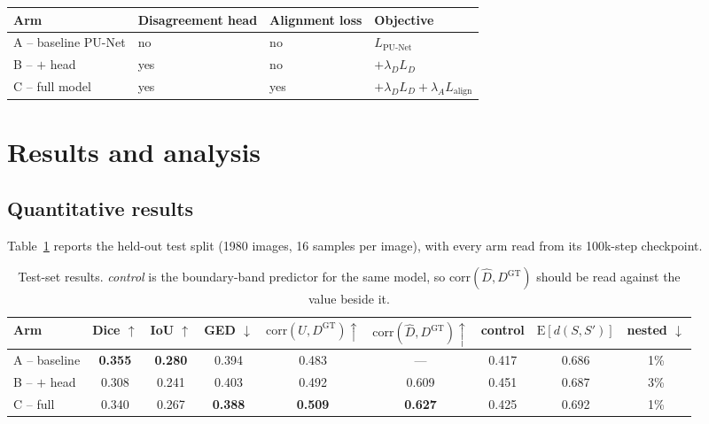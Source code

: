 \documentclass[10pt]{article}
\newcommand{\Dgt}{D^{\mathrm{GT}}}
\begin{document}
\begin{center}\small
\begin{tabular}{llll}
\toprule
Arm & Disagreement head & Alignment loss & Objective \\
\midrule
A -- baseline PU-Net & no  & no  & $L_{\text{PU-Net}}$ \\
B -- $+$ head        & yes & no  & $+\lambda_D L_D$ \\
C -- full model      & yes & yes & $+\lambda_D L_D+\lambda_A L_{\text{align}}$ \\
\bottomrule
\end{tabular}
\end{center}

\section{Results and analysis}\label{sec:results}

\subsection{Quantitative results}

Table~\ref{tab:main} reports the held-out test split (1980 images, 16 samples per
image), with every arm read from its 100k-step checkpoint.

\begin{table}[h]
\centering\footnotesize\setlength{\tabcolsep}{4.5pt}
\begin{tabular}{lcccccccc}
\toprule
Arm & Dice $\uparrow$ & IoU $\uparrow$ & GED $\downarrow$ &
  $\mathrm{corr}(U,\Dgt)\uparrow$ & $\mathrm{corr}(\hat D,\Dgt)\uparrow$ &
  control & $\mathrm{E}[d(S,S')]$ & nested $\downarrow$ \\
\midrule
A -- baseline        & \textbf{0.355} & \textbf{0.280} & 0.394 & 0.483 & --- & 0.417 & 0.686 & 1\% \\
B -- $+$ head        & 0.308 & 0.241 & 0.403 & 0.492 & 0.609 & 0.451 & 0.687 & 3\% \\
C -- full            & 0.340 & 0.267 & \textbf{0.388} & \textbf{0.509} & \textbf{0.627} & 0.425 & 0.692 & 1\% \\
\bottomrule
\end{tabular}
\caption{Test-set results. \emph{control} is the boundary-band predictor for the
same model, so $\mathrm{corr}(\hat D,\Dgt)$ should be read against the value
beside it.}
\label{tab:main}
\end{table}
\end{document}
